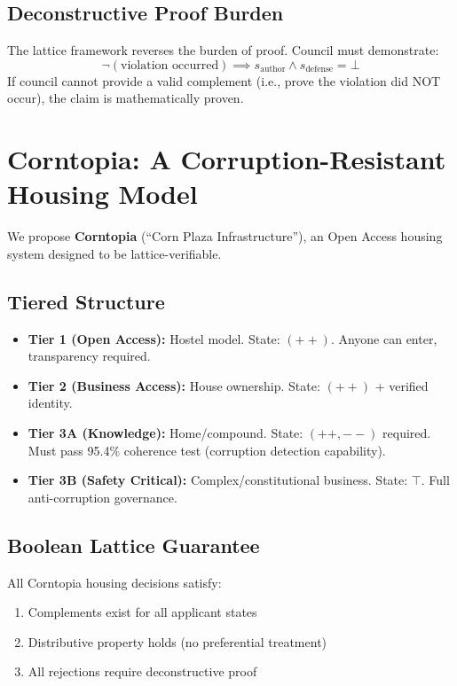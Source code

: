 \documentclass[11pt,a4paper]{article}
\theoremstyle{definition}
\begin{document}
\subsection{Deconstructive Proof Burden}

The lattice framework reverses the burden of proof. Council must demonstrate:
\[
\neg(\text{violation occurred}) \implies s_{\text{author}} \wedge s_{\text{defense}} = \bot
\]
If council cannot provide a valid complement (i.e., prove the violation did NOT occur), the claim is mathematically proven.

\section{Corntopia: A Corruption-Resistant Housing Model}

We propose \textbf{Corntopia} (``Corn Plaza Infrastructure''), an Open Access housing system designed to be lattice-verifiable.

\subsection{Tiered Structure}

\begin{itemize}
    \item \textbf{Tier 1 (Open Access):} Hostel model. State: $(++)$. Anyone can enter, transparency required.
    \item \textbf{Tier 2 (Business Access):} House ownership. State: $(++)$ + verified identity.
    \item \textbf{Tier 3A (Knowledge):} Home/compound. State: $(++,--)$ required. Must pass 95.4\% coherence test (corruption detection capability).
    \item \textbf{Tier 3B (Safety Critical):} Complex/constitutional business. State: $\top$. Full anti-corruption governance.
\end{itemize}

\subsection{Boolean Lattice Guarantee}

All Corntopia housing decisions satisfy:
\begin{enumerate}
    \item Complements exist for all applicant states
    \item Distributive property holds (no preferential treatment)
    \item All rejections require deconstructive proof
\end{enumerate}
\end{document}
